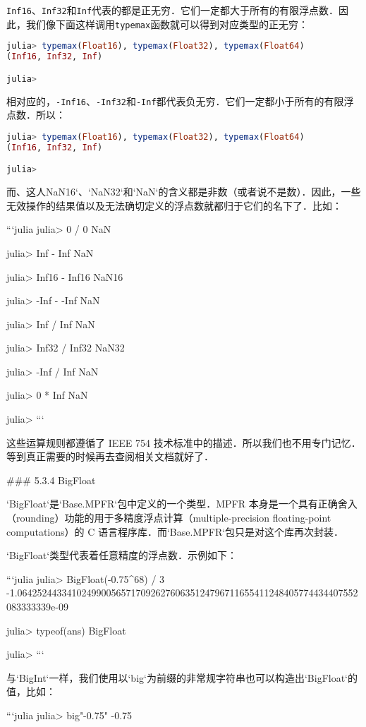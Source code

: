 \verb|Inf16|、\verb|Inf32|和\verb|Inf|代表的都是正无穷．它们一定都大于所有的有限浮点数．因此，我们像下面这样调用\verb|typemax|函数就可以得到对应类型的正无穷：
\begin{lstlisting}[language=julia]
julia> typemax(Float16), typemax(Float32), typemax(Float64)
(Inf16, Inf32, Inf)

julia> 
\end{lstlisting}

相对应的，\verb|-Inf16|、\verb|-Inf32|和\verb|-Inf|都代表负无穷．它们一定都小于所有的有限浮点数．所以：
\begin{lstlisting}[language=julia]
julia> typemax(Float16), typemax(Float32), typemax(Float64)
(Inf16, Inf32, Inf)

julia> 
\end{lstlisting}

而、这人NaN16`、`NaN32`和`NaN`的含义都是非数（或者说不是数）．因此，一些无效操作的结果值以及无法确切定义的浮点数就都归于它们的名下了．比如：

```julia
julia> 0 / 0
NaN

julia> Inf - Inf
NaN

julia> Inf16 - Inf16
NaN16

julia> -Inf - -Inf
NaN

julia> Inf / Inf
NaN

julia> Inf32 / Inf32
NaN32

julia> -Inf / Inf
NaN

julia> 0 * Inf
NaN

julia> 
```

这些运算规则都遵循了 IEEE 754 技术标准中的描述．所以我们也不用专门记忆．等到真正需要的时候再去查阅相关文档就好了．

### 5.3.4 BigFloat

`BigFloat`是`Base.MPFR`包中定义的一个类型．MPFR 本身是一个具有正确舍入（rounding）功能的用于多精度浮点计算（multiple-precision floating-point computations）的 C 语言程序库．而`Base.MPFR`包只是对这个库再次封装．

`BigFloat`类型代表着任意精度的浮点数．示例如下：

```julia
julia> BigFloat(-0.75^68) / 3
-1.064252443341024990056571709262760635124796711655411248405774434407552083333339e-09

julia> typeof(ans)
BigFloat

julia> 
```

与`BigInt`一样，我们使用以`big`为前缀的非常规字符串也可以构造出`BigFloat`的值，比如：

```julia
julia> big"-0.75"
-0.75

